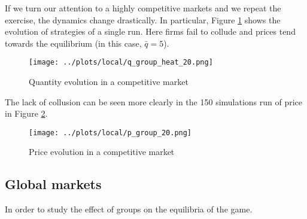 \documentclass[american]{scrartcl}
\begin{document}
If we turn our attention to a highly competitive markets and we repeat the exercise, the dynamics change drastically. In particular, Figure \ref{fig:large_local} shows the evolution of strategies of a single run. Here firms fail to collude and prices tend towards the equilibrium (in this case, $\bar{q} = 5$).

\begin{center}
    \begin{figure}[h!]
        \texttt{[image: ../plots/local/q\_group\_heat\_20.png]}
        \caption{Quantity evolution in a competitive market}
        \label{fig:large_local}
    \end{figure}
\end{center}

The lack of collusion can be seen more clearly in the 150 simulations run of price in Figure \ref{fig:price_large_local}.

\begin{center}
    \begin{figure}[h!]
        \texttt{[image: ../plots/local/p\_group\_20.png]}
        \caption{Price evolution in a competitive market}
        \label{fig:price_large_local}
    \end{figure}
\end{center}

\subsection{Global markets}

In order to study the effect of groups on the equilibria of the game.



\newpage
\nocite{*}
\printbibliography
\end{document}
